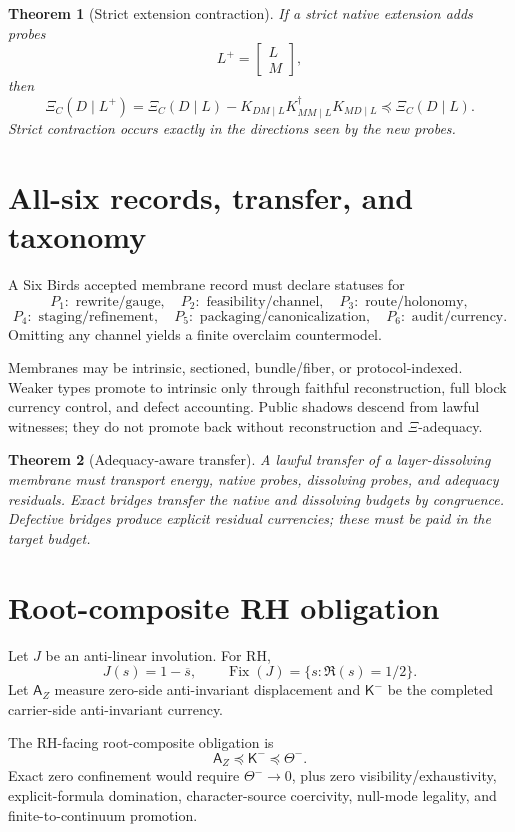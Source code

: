 \documentclass[11pt]{article}
\newtheorem{theorem}{Theorem}[section]
\newcommand{\K}{\mathsf K}
\newcommand{\Fix}{\operatorname{Fix}}
\newcommand{\preceqq}{\preceq}
\begin{document}
\begin{theorem}[Strict extension contraction]
If a strict native extension adds probes
\[
  L^+=\begin{bmatrix}L\\M\end{bmatrix},
\]
then
\[
  \Xi_C(D\mid L^+)=\Xi_C(D\mid L)-K_{DM\mid L}K_{MM\mid L}^\dagger K_{MD\mid L}\preceqq\Xi_C(D\mid L).
\]
Strict contraction occurs exactly in the directions seen by the new probes.
\end{theorem}

\section{All-six records, transfer, and taxonomy}
A Six Birds accepted membrane record must declare statuses for
\[
P_1:\text{ rewrite/gauge},\quad
P_2:\text{ feasibility/channel},\quad
P_3:\text{ route/holonomy},
\]
\[
P_4:\text{ staging/refinement},\quad
P_5:\text{ packaging/canonicalization},\quad
P_6:\text{ audit/currency}.
\]
Omitting any channel yields a finite overclaim countermodel.

Membranes may be intrinsic, sectioned, bundle/fiber, or protocol-indexed.  Weaker types promote to intrinsic only through faithful reconstruction, full block currency control, and defect accounting.  Public shadows descend from lawful witnesses; they do not promote back without reconstruction and \(\Xi\)-adequacy.

\begin{theorem}[Adequacy-aware transfer]
A lawful transfer of a layer-dissolving membrane must transport energy, native probes, dissolving probes, and adequacy residuals.  Exact bridges transfer the native and dissolving budgets by congruence.  Defective bridges produce explicit residual currencies; these must be paid in the target budget.
\end{theorem}

\section{Root-composite RH obligation}
Let \(J\) be an anti-linear involution.  For RH,
\[
  J(s)=1-\overline{s},\qquad \Fix(J)=\{s:\Re(s)=1/2\}.
\]
Let \(\mathsf A_Z\) measure zero-side anti-invariant displacement and \(\K^-\) be the completed carrier-side anti-invariant currency.

The RH-facing root-composite obligation is
\[
  \boxed{\mathsf A_Z\preceqq \K^-\preceqq \Theta^-.}
\]
Exact zero confinement would require \(\Theta^-\to0\), plus zero visibility/exhaustivity, explicit-formula domination, character-source coercivity, null-mode legality, and finite-to-continuum promotion.
\end{document}
